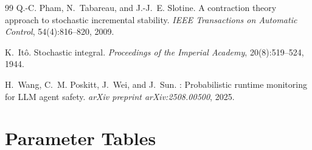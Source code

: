 \documentclass[11pt,twocolumn]{article}
\begin{document}
\begin{thebibliography}{99}
Q.-C. Pham, N.~Tabareau, and J.-J.~E. Slotine.
\newblock A contraction theory approach to stochastic incremental stability.
\newblock \emph{IEEE Transactions on Automatic Control}, 54(4):816--820, 2009.

K.~It\^{o}.
\newblock Stochastic integral.
\newblock \emph{Proceedings of the Imperial Academy}, 20(8):519--524, 1944.

H.~Wang, C.~M. Poskitt, J.~Wei, and J.~Sun.
: Probabilistic runtime monitoring for {LLM} agent
  safety.
\newblock \emph{arXiv preprint arXiv:2508.00500}, 2025.

\end{thebibliography}


\appendix

\section{Parameter Tables}
\label{app:parameters}
\end{document}
